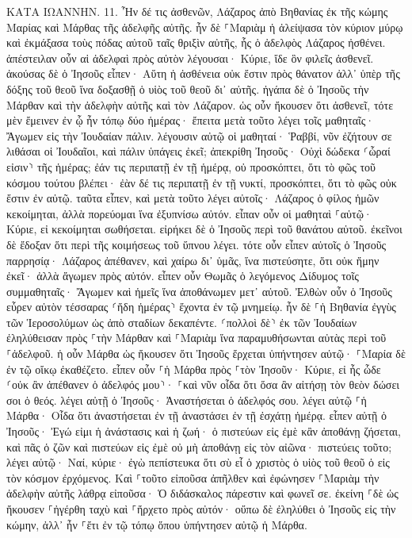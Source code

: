 \documentclass[twoside, 9pt]{extreport}
\begin{document}
ΚΑΤΑ ΙΩΑΝΝΗΝ.
11.
Ἦν δέ τις ἀσθενῶν, Λάζαρος ἀπὸ Βηθανίας ἐκ τῆς κώμης Μαρίας καὶ Μάρθας τῆς ἀδελφῆς αὐτῆς. 
ἦν δὲ ⸀Μαριὰμ ἡ ἀλείψασα τὸν κύριον μύρῳ καὶ ἐκμάξασα τοὺς πόδας αὐτοῦ ταῖς θριξὶν αὐτῆς, ἧς ὁ ἀδελφὸς Λάζαρος ἠσθένει. 
ἀπέστειλαν οὖν αἱ ἀδελφαὶ πρὸς αὐτὸν λέγουσαι· Κύριε, ἴδε ὃν φιλεῖς ἀσθενεῖ. 
ἀκούσας δὲ ὁ Ἰησοῦς εἶπεν· Αὕτη ἡ ἀσθένεια οὐκ ἔστιν πρὸς θάνατον ἀλλ᾽ ὑπὲρ τῆς δόξης τοῦ θεοῦ ἵνα δοξασθῇ ὁ υἱὸς τοῦ θεοῦ δι᾽ αὐτῆς. 
ἠγάπα δὲ ὁ Ἰησοῦς τὴν Μάρθαν καὶ τὴν ἀδελφὴν αὐτῆς καὶ τὸν Λάζαρον. 
ὡς οὖν ἤκουσεν ὅτι ἀσθενεῖ, τότε μὲν ἔμεινεν ἐν ᾧ ἦν τόπῳ δύο ἡμέρας· 
ἔπειτα μετὰ τοῦτο λέγει τοῖς μαθηταῖς· Ἄγωμεν εἰς τὴν Ἰουδαίαν πάλιν. 
λέγουσιν αὐτῷ οἱ μαθηταί· Ῥαββί, νῦν ἐζήτουν σε λιθάσαι οἱ Ἰουδαῖοι, καὶ πάλιν ὑπάγεις ἐκεῖ; 
ἀπεκρίθη Ἰησοῦς· Οὐχὶ δώδεκα ⸂ὧραί εἰσιν⸃ τῆς ἡμέρας; ἐάν τις περιπατῇ ἐν τῇ ἡμέρᾳ, οὐ προσκόπτει, ὅτι τὸ φῶς τοῦ κόσμου τούτου βλέπει· 
ἐὰν δέ τις περιπατῇ ἐν τῇ νυκτί, προσκόπτει, ὅτι τὸ φῶς οὐκ ἔστιν ἐν αὐτῷ. 
ταῦτα εἶπεν, καὶ μετὰ τοῦτο λέγει αὐτοῖς· Λάζαρος ὁ φίλος ἡμῶν κεκοίμηται, ἀλλὰ πορεύομαι ἵνα ἐξυπνίσω αὐτόν. 
εἶπαν οὖν οἱ μαθηταὶ ⸀αὐτῷ· Κύριε, εἰ κεκοίμηται σωθήσεται. 
εἰρήκει δὲ ὁ Ἰησοῦς περὶ τοῦ θανάτου αὐτοῦ. ἐκεῖνοι δὲ ἔδοξαν ὅτι περὶ τῆς κοιμήσεως τοῦ ὕπνου λέγει. 
τότε οὖν εἶπεν αὐτοῖς ὁ Ἰησοῦς παρρησίᾳ· Λάζαρος ἀπέθανεν, 
καὶ χαίρω δι᾽ ὑμᾶς, ἵνα πιστεύσητε, ὅτι οὐκ ἤμην ἐκεῖ· ἀλλὰ ἄγωμεν πρὸς αὐτόν. 
εἶπεν οὖν Θωμᾶς ὁ λεγόμενος Δίδυμος τοῖς συμμαθηταῖς· Ἄγωμεν καὶ ἡμεῖς ἵνα ἀποθάνωμεν μετ᾽ αὐτοῦ. 
Ἐλθὼν οὖν ὁ Ἰησοῦς εὗρεν αὐτὸν τέσσαρας ⸂ἤδη ἡμέρας⸃ ἔχοντα ἐν τῷ μνημείῳ. 
ἦν δὲ ⸀ἡ Βηθανία ἐγγὺς τῶν Ἱεροσολύμων ὡς ἀπὸ σταδίων δεκαπέντε. 
⸂πολλοὶ δὲ⸃ ἐκ τῶν Ἰουδαίων ἐληλύθεισαν πρὸς ⸀τὴν Μάρθαν καὶ ⸀Μαριὰμ ἵνα παραμυθήσωνται αὐτὰς περὶ τοῦ ⸀ἀδελφοῦ. 
ἡ οὖν Μάρθα ὡς ἤκουσεν ὅτι Ἰησοῦς ἔρχεται ὑπήντησεν αὐτῷ· ⸀Μαρία δὲ ἐν τῷ οἴκῳ ἐκαθέζετο. 
εἶπεν οὖν ⸀ἡ Μάρθα πρὸς ⸀τὸν Ἰησοῦν· Κύριε, εἰ ἦς ὧδε ⸂οὐκ ἂν ἀπέθανεν ὁ ἀδελφός μου⸃· 
⸀καὶ νῦν οἶδα ὅτι ὅσα ἂν αἰτήσῃ τὸν θεὸν δώσει σοι ὁ θεός. 
λέγει αὐτῇ ὁ Ἰησοῦς· Ἀναστήσεται ὁ ἀδελφός σου. 
λέγει αὐτῷ ⸀ἡ Μάρθα· Οἶδα ὅτι ἀναστήσεται ἐν τῇ ἀναστάσει ἐν τῇ ἐσχάτῃ ἡμέρᾳ. 
εἶπεν αὐτῇ ὁ Ἰησοῦς· Ἐγώ εἰμι ἡ ἀνάστασις καὶ ἡ ζωή· ὁ πιστεύων εἰς ἐμὲ κἂν ἀποθάνῃ ζήσεται, 
καὶ πᾶς ὁ ζῶν καὶ πιστεύων εἰς ἐμὲ οὐ μὴ ἀποθάνῃ εἰς τὸν αἰῶνα· πιστεύεις τοῦτο; 
λέγει αὐτῷ· Ναί, κύριε· ἐγὼ πεπίστευκα ὅτι σὺ εἶ ὁ χριστὸς ὁ υἱὸς τοῦ θεοῦ ὁ εἰς τὸν κόσμον ἐρχόμενος. 
Καὶ ⸀τοῦτο εἰποῦσα ἀπῆλθεν καὶ ἐφώνησεν ⸀Μαριὰμ τὴν ἀδελφὴν αὐτῆς λάθρᾳ εἰποῦσα· Ὁ διδάσκαλος πάρεστιν καὶ φωνεῖ σε. 
ἐκείνη ⸀δὲ ὡς ἤκουσεν ⸀ἠγέρθη ταχὺ καὶ ⸀ἤρχετο πρὸς αὐτόν· 
οὔπω δὲ ἐληλύθει ὁ Ἰησοῦς εἰς τὴν κώμην, ἀλλ᾽ ἦν ⸀ἔτι ἐν τῷ τόπῳ ὅπου ὑπήντησεν αὐτῷ ἡ Μάρθα. 
\end{document}
